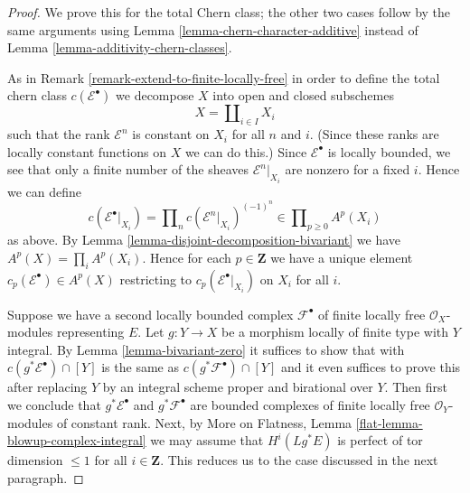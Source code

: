 \begin{proof}
We prove this for the total Chern class; the other two cases follow
by the same arguments using
Lemma \ref{lemma-chern-character-additive}
instead of
Lemma \ref{lemma-additivity-chern-classes}.

\medskip\noindent
As in Remark \ref{remark-extend-to-finite-locally-free} in order
to define the total chern class $c(\mathcal{E}^\bullet)$
we decompose $X$ into open and closed subschemes
$$
X = \coprod\nolimits_{i \in I} X_i
$$
such that the rank $\mathcal{E}^n$ is constant on $X_i$ for
all $n$ and $i$. (Since these ranks are locally constant functions
on $X$ we can do this.) Since $\mathcal{E}^\bullet$ is locally
bounded, we see that only a finite number of the sheaves
$\mathcal{E}^n|_{X_i}$ are nonzero for a fixed $i$. Hence we
can define
$$
c(\mathcal{E}^\bullet|_{X_i}) =
\prod\nolimits_n c(\mathcal{E}^n|_{X_i})^{(-1)^n}
\in \prod\nolimits_{p \geq 0} A^p(X_i)
$$
as above. By Lemma \ref{lemma-disjoint-decomposition-bivariant}
we have $A^p(X) = \prod_i A^p(X_i)$. Hence for each $p \in \mathbf{Z}$
we have a unique element $c_p(\mathcal{E}^\bullet) \in A^p(X)$ restricting
to $c_p(\mathcal{E}^\bullet|_{X_i})$ on $X_i$ for all $i$.

\medskip\noindent
Suppose we have a second locally bounded complex
$\mathcal{F}^\bullet$ of finite locally free $\mathcal{O}_X$-modules
representing $E$.
Let $g : Y \to X$ be a morphism locally of finite type with $Y$ integral.
By Lemma \ref{lemma-bivariant-zero} it suffices to show that
with $c(g^*\mathcal{E}^\bullet) \cap [Y]$ is the same as
$c(g^*\mathcal{F}^\bullet) \cap [Y]$ and it even suffices to prove
this after replacing $Y$ by an integral scheme proper and birational
over $Y$. Then first we conclude that $g^*\mathcal{E}^\bullet$
and $g^*\mathcal{F}^\bullet$ are bounded complexes of finite locally
free $\mathcal{O}_Y$-modules of constant rank. Next, by
More on Flatness, Lemma \ref{flat-lemma-blowup-complex-integral}
we may assume that $H^i(Lg^*E)$ is perfect of tor dimension $\leq 1$
for all $i \in \mathbf{Z}$.
This reduces us to the case discussed in the next paragraph.


\end{proof}
